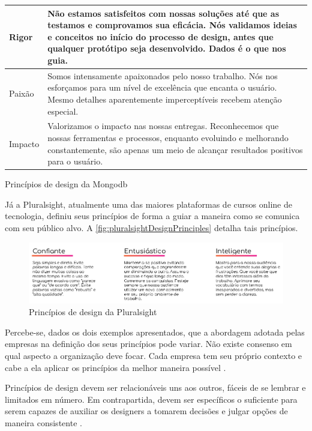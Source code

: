 \begin{quadro}[!htb]
\begin{tabular}{|m{2cm}|m{12cm}|}
		 Rigor & Não estamos satisfeitos com nossas soluções até que as testamos e comprovamos sua eficácia. Nós validamos ideias e conceitos no início do processo de design, antes que  qualquer protótipo seja desenvolvido. Dados é o que nos guia. \\\hline
		 
		 Paixão & Somos intensamente apaixonados pelo nosso trabalho. Nós nos esforçamos para um nível de excelência que encanta o usuário. Mesmo detalhes aparentemente imperceptíveis recebem atenção especial. \\\hline
		 
		 Impacto & Valorizamos o impacto nas nossas entregas. Reconhecemos que nossas ferramentas e processos, enquanto evoluindo e melhorando constantemente, são apenas um meio de alcançar resultados positivos para o usuário. \\\hline
			
	\end{tabular}
	\caption{Princípios de design da Mongodb}
	\label{table:mongodbDesignPrinciples}
\end{quadro}

Já a Pluralsight, atualmente uma das maiores plataformas de cursos online de tecnologia, definiu seus princípios de forma a guiar a maneira como se comunica com seu público alvo. A \autoref{fig:pluralsightDesignPrinciples} detalha tais princípios.

\begin{figure}
	\includegraphics[width=\linewidth]{./04-figuras/02_referencial_teorico/pluralsight-principles.png}
	\caption{Princípios de design da Pluralsight}
  \label{fig:pluralsightDesignPrinciples}
\end{figure}

Percebe-se, dados os dois exemplos apresentados, que a abordagem adotada pelas empresas na definição dos seus princípios pode variar. Não existe consenso em qual aspecto a organização deve focar. Cada empresa tem seu próprio contexto e cabe a ela aplicar os princípios da melhor maneira possível \cite{kholmatova2017design}.

Princípios de design devem ser relacionáveis uns aos outros, fáceis de se lembrar e limitados em número. Em contrapartida, devem ser específicos o suficiente para serem capazes de auxiliar os designers a tomarem decisões e julgar opções de maneira consistente \cite{kholmatova2017design}.

